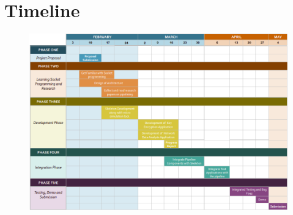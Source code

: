 \vspace*{5mm}

\section*{Timeline} {
	\begin{figure}[!h]
		\centering
		\includegraphics[scale=0.46]{img/timeline.png}
		\label{fig:timeline}
	\end{figure}
}
\newpage

